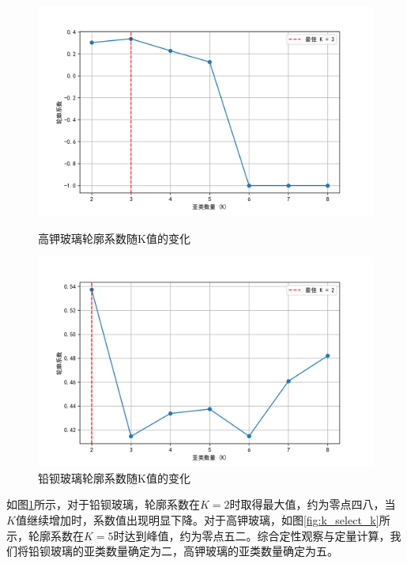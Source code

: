 \begin{figure}[H]
    \centering
    \begin{minipage}{0.48\textwidth}
        \centering
        \includegraphics[width=\linewidth]{figs/4问题二/高钾玻璃_最佳K值选择.png}
        \caption{高钾玻璃轮廓系数随K值的变化}
        \label{fig:k_select_k}
    \end{minipage}\hfill
    \begin{minipage}{0.48\textwidth}
        \centering
        \includegraphics[width=\linewidth]{figs/4问题二/铅钡玻璃_最佳K值选择.png}
        \caption{铅钡玻璃轮廓系数随K值的变化}
        \label{fig:k_select_pb}
    \end{minipage}
\end{figure}

如图\ref{fig:k_select_pb}所示，对于铅钡玻璃，轮廓系数在$K=2$时取得最大值，约为零点四八，当$K$值继续增加时，系数值出现明显下降。对于高钾玻璃，如图\ref{fig:k_select_k}所示，轮廓系数在$K=5$时达到峰值，约为零点五二。综合定性观察与定量计算，我们将铅钡玻璃的亚类数量确定为二，高钾玻璃的亚类数量确定为五。

